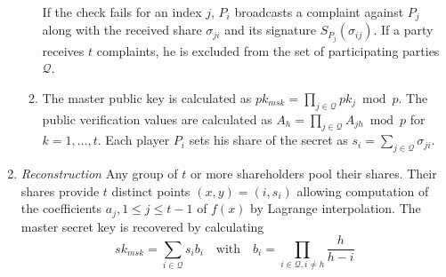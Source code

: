 \begin{algorithm}
\begin{enumerate}
\begin{enumerate}
    If the check fails for an index $j$, $P_i$ broadcasts a complaint against $P_j$ along with the received share $\sigma_{ji}$ and its signature $S_{P_j} \left( \sigma_{ij} \right)$. If a party receives $t$ complaints, he is excluded from the set of participating parties $\mathcal{Q}$.
    \item The master public key is calculated as $pk_{msk} = \prod_{j \in \mathcal{Q}} pk_j \bmod p$. The public verification values are calculated as $A_h = \prod_{j \in \mathcal{Q}}A_{jh} \bmod p$ for $k=1, \ldots, t$. Each player $P_i$ sets his share of the secret as $s_i = \sum_{j \in \mathcal{Q}} \sigma_{ji}$.
   \end{enumerate}
   \item \textit{Reconstruction} Any group of $t$ or more shareholders pool their shares. Their shares provide $t$ distinct points $\left( x, y \right) = \left( i, s_i \right)$ allowing computation of the coefficients $a_j, 1 \leq j \leq t-1$ of $f \left( x \right)$ by Lagrange interpolation. The master secret key is recovered by calculating
   \begin{equation*}
    sk_{msk} = \sum_{i \in \mathcal{Q}} s_i b_i \quad \textrm{with} \quad b_i = \prod_{i \in \mathcal{Q}, i \neq h} \frac{h}{h-i}
   \end{equation*}
 \end{enumerate}
\end{algorithm}


